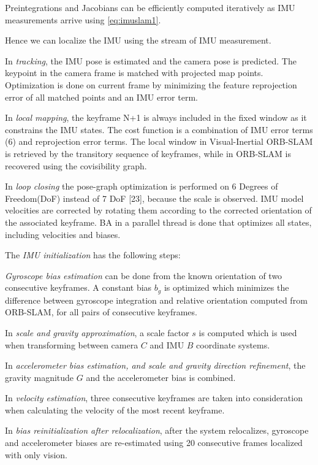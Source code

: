 Preintegrations and Jacobians can be efficiently computed iteratively as IMU measurements arrive using \ref{eq:imuslam1}.

Hence we can localize the IMU using the stream of IMU measurement.

In \textit{tracking}, the IMU pose is estimated and the camera pose is predicted. The keypoint in the camera frame is matched with projected map points. Optimization is done on current frame by minimizing the feature reprojection error of all matched points and an IMU error term. 

In \textit{local mapping}, the keyframe N+1 is always included in the fixed window as it constrains the IMU states. The cost function is a combination of IMU error terms (6) and reprojection error terms. The local window in Visual-Inertial ORB-SLAM is retrieved by the transitory sequence of keyframes, while in ORB-SLAM is recovered using the covisibility graph.

In \textit{loop closing} the pose-graph optimization is performed on 6 Degrees of Freedom(DoF) instead of 7 DoF [23], because the scale is observed.  IMU model velocities are corrected by rotating them according to the corrected orientation of the associated keyframe.  BA in a parallel thread is done that optimizes all states, including velocities and biases. 

The \textit{IMU initialization} has the following steps:


\textit{Gyroscope bias estimation} can be done from the known orientation of two consecutive keyframes. A constant bias $b_g$ is optimized which minimizes the difference between gyroscope integration and relative orientation computed from ORB-SLAM, for all pairs of consecutive keyframes.

In \textit{scale and gravity approximation}, a scale  factor $s$ is computed which is used when transforming between camera $C$ and IMU $B$ coordinate systems.

In \textit{accelerometer bias estimation, and scale and gravity direction refinement}, the gravity magnitude $G$ and the accelerometer bias is combined.

In \textit{velocity estimation}, three consecutive keyframes are taken into consideration when calculating the velocity of the most recent keyframe.

In \textit{bias reinitialization after relocalization}, after the system relocalizes, gyroscope and accelerometer biases are re-estimated using 20 consecutive frames localized with only vision.



\FloatBarrier

